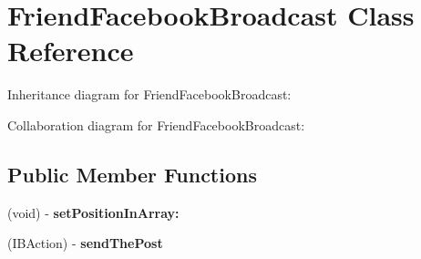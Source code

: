 \hypertarget{interface_friend_facebook_broadcast}{
\section{\-Friend\-Facebook\-Broadcast \-Class \-Reference}
\label{interface_friend_facebook_broadcast}
}


\-Inheritance diagram for \-Friend\-Facebook\-Broadcast\-:


\-Collaboration diagram for \-Friend\-Facebook\-Broadcast\-:
\subsection*{\-Public \-Member \-Functions}
\begin{DoxyCompactItemize}
\item 
\hypertarget{interface_friend_facebook_broadcast_a785cabf12d2f6ef24cfc73840a59aa5f}{
(void) -\/ {\bfseries set\-Position\-In\-Array\-:}}
\label{interface_friend_facebook_broadcast_a785cabf12d2f6ef24cfc73840a59aa5f}

\item 
\hypertarget{interface_friend_facebook_broadcast_abb6de449f850adddd8d3b03ad478a949}{
(\-I\-B\-Action) -\/ {\bfseries send\-The\-Post}}
\label{interface_friend_facebook_broadcast_abb6de449f850adddd8d3b03ad478a949}

\end{DoxyCompactItemize}
